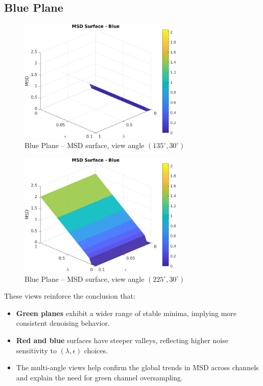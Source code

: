 \documentclass[11pt]{article}
\begin{document}
\subsection*{Blue Plane}
\begin{figure}[h!]
\centering
\includegraphics[width=0.7\textwidth]{../utils/results/msd_surfaces/msd_surface_blue_angle_135_30.png}
\caption{Blue Plane – MSD surface, view angle $(135^\circ, 30^\circ)$}
\end{figure}
\clearpage

\begin{figure}[h!]
\centering
\includegraphics[width=0.7\textwidth]{../utils/results/msd_surfaces/msd_surface_blue_angle_225_30.png}
\caption{Blue Plane – MSD surface, view angle $(225^\circ, 30^\circ)$}
\end{figure}
\clearpage

\noindent These views reinforce the conclusion that:
\begin{itemize}
  \item \textbf{Green planes} exhibit a wider range of stable minima, implying more consistent denoising behavior.
  \item \textbf{Red and blue} surfaces have steeper valleys, reflecting higher noise sensitivity to $(\lambda, \epsilon)$ choices.
  \item The multi-angle views help confirm the global trends in MSD across channels and explain the need for green channel oversampling.
\end{itemize}
\clearpage
\end{document}
